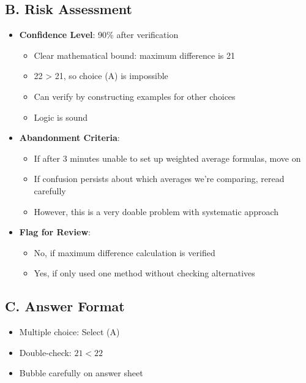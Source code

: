 \documentclass[12pt]{article}
\begin{document}
\begin{competitionbox}
\subsection*{B. Risk Assessment}
\begin{itemize}[leftmargin=*]
    \item \textbf{Confidence Level}: 90\% after verification
    \begin{itemize}
        \item Clear mathematical bound: maximum difference is 21
        \item 22 > 21, so choice (A) is impossible
        \item Can verify by constructing examples for other choices
        \item Logic is sound
    \end{itemize}
    \item \textbf{Abandonment Criteria}: 
    \begin{itemize}
        \item If after 3 minutes unable to set up weighted average formulas, move on
        \item If confusion persists about which averages we're comparing, reread carefully
        \item However, this is a very doable problem with systematic approach
    \end{itemize}
    \item \textbf{Flag for Review}: 
    \begin{itemize}
        \item No, if maximum difference calculation is verified
        \item Yes, if only used one method without checking alternatives
    \end{itemize}
\end{itemize}

\subsection*{C. Answer Format}
\begin{itemize}[leftmargin=*]
    \item Multiple choice: Select (A)
    \item Double-check: $21 < 22$ \checkmark
    \item Bubble carefully on answer sheet
\end{itemize}
\end{competitionbox}
\end{document}

